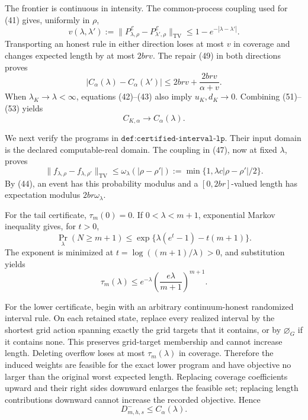 The frontier is continuous in intensity.  The common-process coupling
used for (41) gives, uniformly in \(\rho\),
\[
 v(\lambda,\lambda')
 :=\|P^{\mathcal E}_{\lambda,\rho}
 -P^{\mathcal E}_{\lambda',\rho}\|_{\mathrm{TV}}
 \le1-e^{-|\lambda-\lambda'|}.
\]
Transporting an honest rule in either direction loses at most \(v\) in
coverage and changes expected length by at most \(2brv\).  The repair
(49) in both directions proves
\[
 |C_\alpha(\lambda)-C_\alpha(\lambda')|
 \le2brv+\frac{2brv}{\alpha+v}.
 \tag{53}
\]
When \(\lambda_K\to\lambda<\infty\), equations (42)--(43) also imply
\(u_K,d_K\to0\).  Combining (51)--(53) yields
\[
 C_{K,\alpha}\longrightarrow C_\alpha(\lambda).
 \tag{54}
\]

We next verify the programs in
\(\texttt{def:certified-interval-lp}\).  Their input domain is the
declared computable-real domain.  The coupling in (47), now at fixed
\(\lambda\), proves
\[
 \|f_{\lambda,\rho}-f_{\lambda,\rho'}\|_{\mathrm{TV}}
 \le
 \omega_\lambda(|\rho-\rho'|)
 :=\min\{1,\lambda c|\rho-\rho'|/2\}.
 \tag{55}
\]
By (44), an event has this probability modulus and a
\([0,2br]\)-valued length has expectation modulus
\(2br\omega_\lambda\).

For the tail certificate, \(\tau_m(0)=0\).  If
\(0<\lambda<m+1\), exponential Markov inequality gives, for \(t>0\),
\[
 \Pr_\lambda(N\ge m+1)
 \le\exp\{\lambda(e^t-1)-t(m+1)\}.
 \tag{56}
\]
The exponent is minimized at
\(t=\log((m+1)/\lambda)>0\), and substitution yields
\[
 \tau_m(\lambda)
 \le e^{-\lambda}
 \left(\frac{e\lambda}{m+1}\right)^{m+1}.
 \tag{57}
\]

For the lower certificate, begin with an arbitrary continuum-honest
randomized interval rule.  On each retained state, replace every
realized interval by the shortest grid action spanning exactly the grid
targets that it contains, or by \(\varnothing_G\) if it contains none.
This preserves grid-target membership and cannot increase length.
Deleting overflow loses at most \(\tau_m(\lambda)\) in coverage.
Therefore the induced weights are feasible for the exact lower program
and have objective no larger than the original worst expected length.
Replacing coverage coefficients upward and their right sides downward
enlarges the feasible set; replacing length contributions downward
cannot increase the recorded objective.  Hence
\[
 D_{m,h,s}^-\le C_\alpha(\lambda).
 \tag{58}
\]


